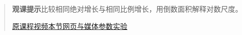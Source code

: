 \begin{quote}\small\textbf{观课提示}\quad 比较相同绝对增长与相同比例增长，用倒数面积解释对数尺度。

\href{https://www.youtube.com/watch?v=4PDoT7jtxmw}{原课程视频}\quad\href{https://vitael04213.github.io/3blue1brown-notes/lessons/ldm-natural-logs.html}{本节网页与媒体}\quad\href{https://vitael04213.github.io/3blue1brown-notes/lab.html\#derivative}{参数实验}
\end{quote}
